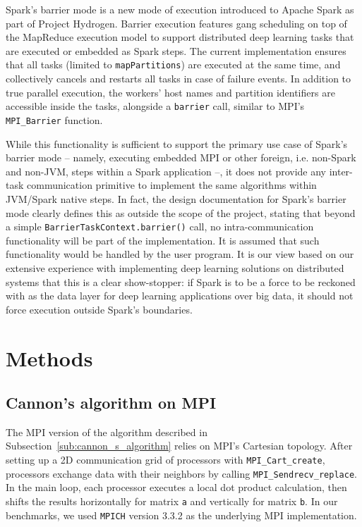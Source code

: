 \documentclass[fleqn,10pt]{SelfArx} %
\begin{document}
Spark's barrier mode is a new mode of execution introduced to Apache Spark as part of Project Hydrogen.\cite{projecthydrogensite} Barrier execution features gang scheduling on top of the MapReduce execution model to support distributed deep learning tasks that are executed or embedded as Spark steps. The current implementation ensures that all tasks (limited to \texttt{mapPartitions}) are executed at the same time, and collectively cancels and restarts all tasks in case of failure events. In addition to true parallel execution, the workers' host names and partition identifiers are accessible inside the tasks, alongside a \texttt{barrier} call, similar to MPI's \texttt{MPI\_Barrier} function.\cite{projecthydrogenpres}

While this functionality is sufficient to support the primary use case of Spark's barrier mode -- namely, executing embedded MPI or other foreign, i.e. non-Spark and non-JVM, steps within a Spark application --, it does not provide any inter-task communication primitive to implement the same algorithms within JVM/Spark native steps. In fact, the design documentation for Spark's barrier mode clearly defines this as outside the scope of the project, stating that beyond a simple \texttt{BarrierTaskContext.barrier()} call, no intra-communication functionality will be part of the implementation. It is assumed that such functionality would be handled by the user program. It is our view based on our extensive experience with implementing deep learning solutions on distributed systems that this is a clear show-stopper: if Spark is to be a force to be reckoned with as the data layer for deep learning applications over big data, it should not force execution outside Spark's boundaries.



\section{Methods} %
\label{sec:methods}

\subsection{Cannon's algorithm on MPI} %
\label{sub:cannon_s_algorithm_on_mpi}

The MPI version of the algorithm described in Subsection~\ref{sub:cannon_s_algorithm} relies on MPI's Cartesian topology. After setting up a 2D communication grid of processors with \texttt{MPI\_Cart\_create}, processors exchange data with their neighbors by calling \texttt{MPI\_Sendrecv\_replace}. In the main loop, each processor executes a local dot product calculation, then shifts the results horizontally for matrix \texttt{a} and vertically for matrix \texttt{b}. In our benchmarks, we used \texttt{MPICH} version 3.3.2 as the underlying MPI implementation.
\end{document}
